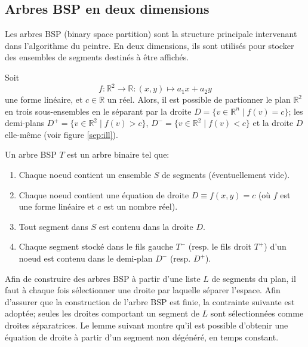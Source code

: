 \subsection{Arbres BSP en deux dimensions}
Les arbres BSP (binary space partition) sont la structure principale
intervenant dans l'algorithme du peintre. En deux dimensions, ils sont
utilisés pour stocker des ensembles de segments destinés à être affichés.


Soit
\begin{equation} \label{lin:forme}
f: \mathbb R^2 \to \mathbb R: (x, y)\mapsto a_1x +a_2y
\end{equation}
une forme linéaire, et $c\in\mathbb R$ un réel. Alors, il est possible de
partionner le plan $\mathbb R^2$ en trois sous-ensembles en le séparant
par la droite $D = \{v\in\mathbb R^n\mid f(v) = c\}$; les demi-plans
$D^+ = \{v\in\mathbb R^2\mid f(v) > c\}$,
$D^- = \{v\in\mathbb R^2\mid f(v) < c\}$ et la droite $D$ elle-même
(voir figure \ref{sep:ill}).



\begin{df}
  Un arbre BSP $T$ est un arbre binaire tel que:
  \begin{enumerate}
  \item Chaque noeud contient un ensemble $S$ de segments (éventuellement
    vide).
  \item Chaque noeud contient une équation de droite $D\equiv f(x, y) = c$ (où $f$
    est une forme linéaire et $c$ est un nombre réel).
  \item Tout segment dans $S$ est contenu dans la droite $D$.
  \item Chaque segment stocké dans le fils gauche $T^-$ (resp.
    le fils droit $T^+$) d'un noeud est contenu dans le demi-plan
    $D^-$ (resp. $D^+$).
  \end{enumerate}
\end{df}

Afin de construire des arbres BSP à partir d'une liste $L$ de segments
du plan, il faut à chaque fois sélectionner une droite par laquelle
séparer l'espace. Afin d'assurer que la construction de l'arbre BSP
est finie, la contrainte suivante est adoptée;
seules les droites comportant un segment de $L$ sont sélectionnées comme
droites séparatrices.
Le lemme suivant montre qu'il est possible d'obtenir une équation de droite
à partir d'un segment non dégénéré, en temps constant.

